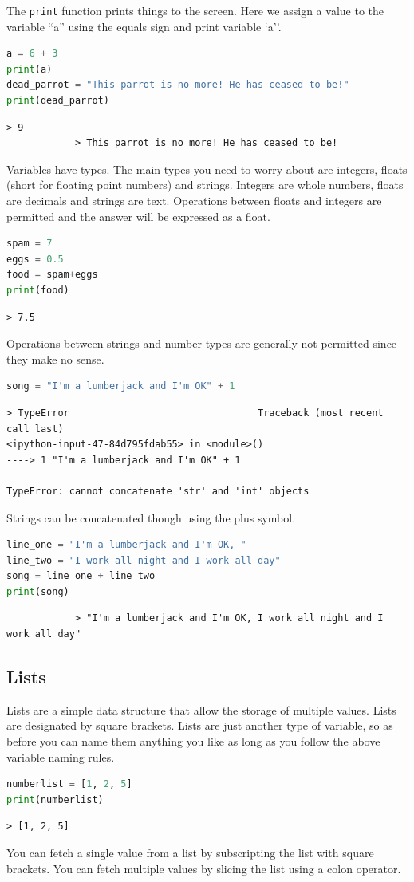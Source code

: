 The \texttt{print} function prints things to the screen. Here we assign a value to the variable ``a'' using the equals sign and print variable `a''.
		\begin{lstlisting}[language=Python]
a = 6 + 3
print(a)
dead_parrot = "This parrot is no more! He has ceased to be!"
print(dead_parrot)\end{lstlisting}
		\begin{verbatim}> 9
			> This parrot is no more! He has ceased to be!
		\end{verbatim}
		Variables have types. The main types you need to worry about are integers, floats (short for floating point numbers) and strings. Integers are whole numbers, floats are decimals and strings are text. Operations between floats and integers are permitted and the answer will be expressed as a float.
		\begin{lstlisting}[language=Python]
spam = 7
eggs = 0.5
food = spam+eggs
print(food)
\end{lstlisting}
		\begin{verbatim}> 7.5\end{verbatim}	
		Operations between strings and number types are generally not permitted since they make no sense.
		\begin{lstlisting}[language=Python]
song = "I'm a lumberjack and I'm OK" + 1\end{lstlisting}
		\begin{verbatim}> TypeError                                 Traceback (most recent call last)
<ipython-input-47-84d795fdab55> in <module>()
----> 1 "I'm a lumberjack and I'm OK" + 1

TypeError: cannot concatenate 'str' and 'int' objects\end{verbatim}

Strings can be concatenated though using the plus symbol.	
		\begin{lstlisting}[language=Python]
line_one = "I'm a lumberjack and I'm OK, "
line_two = "I work all night and I work all day"
song = line_one + line_two
print(song)\end{lstlisting}
		\begin{verbatim}
			> "I'm a lumberjack and I'm OK, I work all night and I work all day"
		\end{verbatim}

	\subsection{Lists}
	Lists are a simple data structure that allow the storage of multiple values. Lists are designated by square brackets. Lists are just another type of variable, so as before you can name them anything you like as long as you follow the above variable naming rules.
		\begin{lstlisting}[language=Python]
numberlist = [1, 2, 5]
print(numberlist)\end{lstlisting}
		\begin{verbatim}> [1, 2, 5]\end{verbatim}
		You can fetch a single value from a list by subscripting the list with square brackets. You can fetch multiple values by slicing the list using a colon operator.
		
